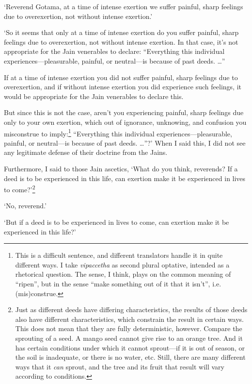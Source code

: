 \documentclass[12pt,openany]{book}%
\begin{document}
‘Reverend Gotama, at a time of intense exertion we suffer painful, sharp feelings due to overexertion, not without intense exertion.’ 

‘So it seems that only at a time of intense exertion do you suffer painful, sharp feelings due to overexertion, not without intense exertion. In that case, it’s not appropriate for the Jain venerables to declare: “Everything this individual experiences—pleasurable, painful, or neutral—is because of past deeds. …” 

If at a time of intense exertion you did not suffer painful, sharp feelings due to overexertion, and if without intense exertion you did experience such feelings, it would be appropriate for the Jain venerables to declare this. 

But since this is not the case, aren’t you experiencing painful, sharp feelings due only to your own exertion, which out of ignorance, unknowing, and confusion you misconstrue to imply:\footnote{This is a difficult sentence, and different translators handle it in quite different ways. I take \textit{vipaccetha} as second plural optative, intended as a rhetorical question. The sense, I think, plays on the common meaning of “ripen”, but in the sense “make something out of it that it isn’t”, i.e. (mis)construe. } “Everything this individual experiences—pleasurable, painful, or neutral—is because of past deeds. …”?’ When I said this, I did not see any legitimate defense of their doctrine from the Jains. 

Furthermore, I said to those Jain ascetics, ‘What do you think, reverends? If a deed is to be experienced in this life, can exertion make it be experienced in lives to come?’\footnote{Just as different deeds have differing characteristics, the results of those deeds also have different characteristics, which constrain the result in certain ways. This does not mean that they are fully deterministic, however. Compare the sprouting of a seed. A mango seed cannot give rise to an orange tree. And it has certain conditions under which it cannot sprout—if it is out of season, or the soil is inadequate, or there is no water, etc. Still, there are many different ways that it \emph{can} sprout, and the tree and its fruit that result will vary according to conditions. } 

‘No, reverend.’ 

‘But if a deed is to be experienced in lives to come, can exertion make it be experienced in this life?’ 
\end{document}
